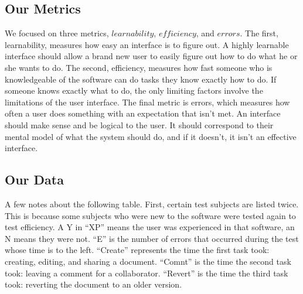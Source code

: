 \documentclass[a4paper,12pt]{article}
\begin{document}
\subsection{Our Metrics}

 We focused on three metrics, $learnability$, $efficiency$, and $errors$. The first, learnability, measures how easy an interface is to figure out. A highly learnable interface should allow a brand new user to easily figure out how to do what he or she wants to do. The second, efficiency, measures how fast someone who is knowledgeable of the software can do tasks they know exactly how to do. If someone knows exactly what to do, the only limiting factors involve the limitations of the user interface. The final metric is errors, which measures how often a user does something with an expectation that isn't met. An interface should make sense and be logical to the user. It should correspond to their mental model of what the system should do, and if it doesn't, it isn't an effective interface.

\subsection{Our Data}

A few notes about the following table. First, certain test subjects are listed twice. This is because some subjects who were new to the software were tested again to test efficiency. A Y in ``XP'' means the user was experienced in that software, an N means they were not. ``E'' is the number of errors that occurred during the test whose time is to the left. ``Create'' represents the time the first task took: creating, editing, and sharing a document. ``Comnt'' is the time the second task took: leaving a comment for a collaborator. ``Revert'' is the time the third task took: reverting the document to an older version.
\end{document}
